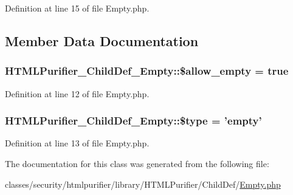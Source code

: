 Definition at line 15 of file Empty.\+php.



\subsection{Member Data Documentation}
\hypertarget{classHTMLPurifier__ChildDef__Empty_aac95e7cc2a385915d0db8fc88954e252}{
\subsubsection[{\$allow\+\_\+empty}]{\setlength{\rightskip}{0pt plus 5cm}H\+T\+M\+L\+Purifier\+\_\+\+Child\+Def\+\_\+\+Empty\+::\$allow\+\_\+empty = true}}\label{classHTMLPurifier__ChildDef__Empty_aac95e7cc2a385915d0db8fc88954e252}


Definition at line 12 of file Empty.\+php.

\hypertarget{classHTMLPurifier__ChildDef__Empty_ac69b98705c247629be35b69cd9e98dff}{
\subsubsection[{\$type}]{\setlength{\rightskip}{0pt plus 5cm}H\+T\+M\+L\+Purifier\+\_\+\+Child\+Def\+\_\+\+Empty\+::\$type = 'empty'}}\label{classHTMLPurifier__ChildDef__Empty_ac69b98705c247629be35b69cd9e98dff}


Definition at line 13 of file Empty.\+php.



The documentation for this class was generated from the following file\+:\begin{DoxyCompactItemize}
\item 
classes/security/htmlpurifier/library/\+H\+T\+M\+L\+Purifier/\+Child\+Def/\hyperlink{ChildDef_2Empty_8php}{Empty.\+php}\end{DoxyCompactItemize}

